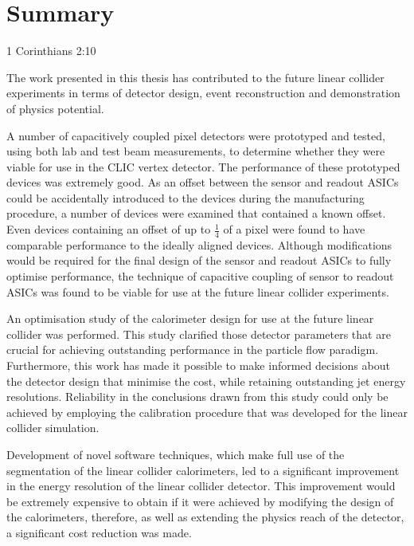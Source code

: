 \chapter{Summary}
\label{chap:summary}

{1 Corinthians 2:10}



The work presented in this thesis has contributed to the future linear collider experiments in terms of detector design, event reconstruction and demonstration of physics potential.  

A number of capacitively coupled pixel detectors were prototyped and tested, using both lab and test beam measurements, to determine whether they were viable for use in the CLIC vertex detector.  The performance of these prototyped devices was extremely good.  As an offset between the sensor and readout ASICs could be accidentally introduced to the devices during the manufacturing procedure, a number of devices were examined that contained a known offset.  {Even devices containing} an offset of up to $\frac{1}{4}$ of a pixel were found to have comparable performance to the ideally aligned devices.  Although modifications would be required for the final design of the sensor and readout ASICs to fully optimise performance, the technique of capacitive coupling of sensor to readout ASICs was found to be viable for use at the future linear collider experiments.  

An optimisation study of the calorimeter design for use at the future linear collider was performed.  This study clarified those detector parameters that are crucial for achieving outstanding performance in the particle flow paradigm.  Furthermore, this work has made it possible to make informed decisions about the detector design that minimise the cost, while retaining outstanding jet energy resolutions.  Reliability in the conclusions drawn from this study could only be achieved by employing the calibration procedure that was developed for the linear collider simulation.  

Development of novel software techniques, which make full use of the segmentation of the linear collider calorimeters, led to a significant improvement in the energy resolution of the linear collider detector.  This improvement would be extremely expensive to obtain if it were achieved by modifying the design of the calorimeters, therefore, as well as extending the physics reach of the detector, a significant cost reduction was made.   

